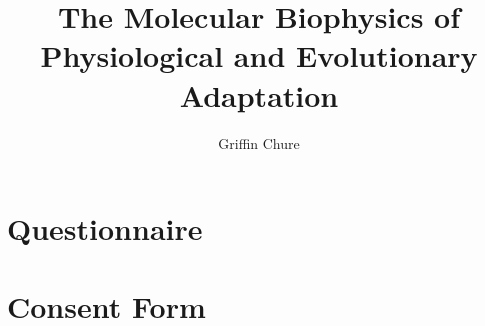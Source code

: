 \documentclass[11pt]{caltech_thesis}
\begin{document}
\title{The Molecular Biophysics of Physiological and Evolutionary Adaptation}
\author{Griffin Chure}
\address{Pasadena, California}                     
\maketitle[logo]


\begin{acknowledgements}
   
\end{acknowledgements}

\begin{abstract}
   
\end{abstract}

\begin{publishedcontent}[iknowwhattodo]
\nocite{razo-mejia2018, chure2018, phillips2019, chure2019, hirokawa2019}
\putbib[ownpubs]
\end{publishedcontent}
\tableofcontents
\listoffigures
\listoftables
\printnomenclature
\mainmatter
\begin{bibunit}  

\putbib[library]
\end{bibunit}

\begin{bibunit}

\putbib[library]
\end{bibunit}

% 
% 

\appendix
\chapter{Questionnaire}
\chapter{Consent Form}
\printindex
\end{document}
